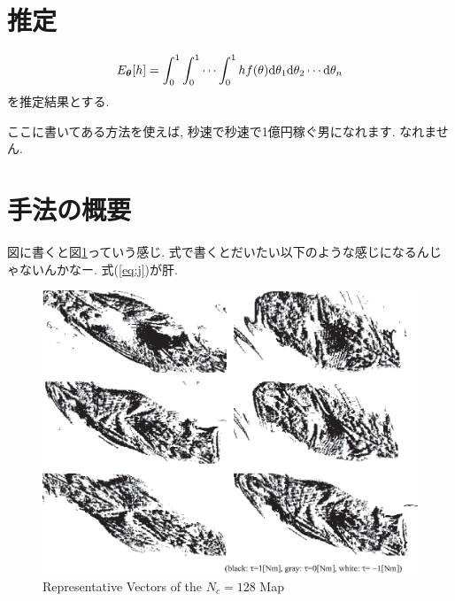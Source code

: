 \section{推定}
\begin{equation} \label{eq:exp}
    E_{\boldsymbol{\theta}} [h] = \int_{0}^{1} \int_{0}^{1} \cdots \int_{0}^{1} h f(\theta) \mathrm{d}\theta_1 \mathrm{d}\theta_2 \cdots \mathrm{d}\theta_n
\end{equation}
を推定結果とする. 

ここに書いてある方法を使えば, 秒速で秒速で1億円稼ぐ男になれます. なれません. 


\section{手法の概要}

図に書くと図\ref{fig:vq_map_128part}っていう感じ. 
式で書くとだいたい以下のような感じになるんじゃないんかなー. 
式(\ref{eq:j})が肝. 

\begin{figure}[h]
        \begin{center}
        \includegraphics[width=1.0\linewidth]{figs/vq_map_128part.eps}
        \caption{Representative Vectors of the $N_c = 128$ Map}
        \label{fig:vq_map_128part}
        \end{center}
\end{figure}




